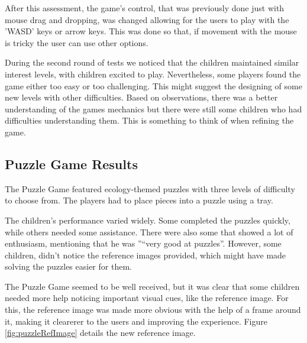 After this assessment, the game's control, that was previously done just with mouse drag and dropping, was changed allowing for the users to play with the 'WASD' keys or arrow keys. This was done so that, if movement with the mouse is tricky the user can use other options.

During the second round of tests we noticed that the children maintained similar interest levels, with children excited to play. Nevertheless, some players found the game either too easy or too challenging. This might suggest the designing of some new levels with other difficulties. Based on observations, there was a better understanding of the games mechanics but there were still some children who had difficulties understanding them. This is something to think of when refining the game.


\subsection{Puzzle Game Results}

The Puzzle Game featured ecology-themed puzzles with three levels of difficulty to choose from. The players had to place pieces into a puzzle using a tray.

The children’s performance varied widely. Some completed the puzzles quickly, while others needed some assistance. There were also some that showed a lot of enthusiasm, mentioning that he was ''“very good at puzzles''. However, some children, didn’t notice the reference images provided, which might have made solving the puzzles easier for them.

The Puzzle Game seemed to be well received, but it was clear that some children needed more help noticing important visual cues, like the reference image. For this, the reference image was made more obvious with the help of a frame around it, making it clearerer to the users and improving the experience. Figure \ref{fig:puzzleRefImage} details the new reference image.

